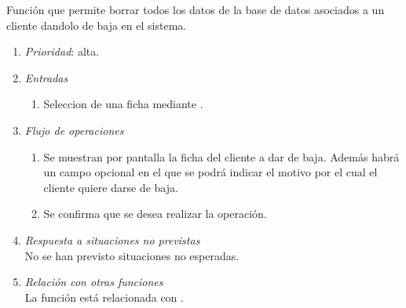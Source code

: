 

 \label{fun:bajacliente}
	Función que permite borrar todos los datos de la base de datos asociados a un cliente dandolo de baja en el sistema.
	
\begin{enumerate}
	\item \textit{Prioridad}: alta.
	\item \textit{Entradas}
	\begin{enumerate}
		\item Seleccion de una ficha mediante .
	\end{enumerate}
	\item \textit{Flujo de operaciones}
	\begin{enumerate}
		\item Se muestran por pantalla la ficha del cliente a dar de baja. Además habrá un campo opcional en el que se podrá indicar el motivo por el cual el cliente quiere darse de baja.
		\item Se confirma que se desea realizar la operación.
	\end{enumerate}

	\item \textit{Respuesta a situaciones no previstas} \\
		No se han previsto situaciones no esperadas.

	\item \textit{Relación con otras funciones} \\
		La función está relacionada con .

\end{enumerate}
